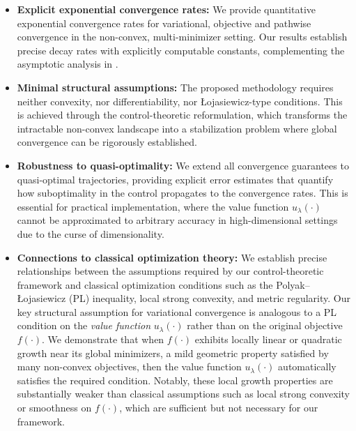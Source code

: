 \documentclass[12pt]{amsart}
\numberwithin{equation}{section}
\theoremstyle{plain}
\begin{document}
\begin{itemize}
	\item \textbf{Explicit exponential convergence rates:} We provide quantitative exponential convergence rates for variational, objective and pathwise convergence in the non-convex, multi-minimizer setting. Our results establish precise decay rates with explicitly computable constants, complementing the asymptotic analysis in \cite{huang2025control}.
	
	\item \textbf{Minimal structural assumptions:} The proposed methodology requires neither convexity, nor differentiability, nor \L{}ojasiewicz-type conditions. This is achieved through the control-theoretic reformulation, which transforms the intractable non-convex landscape into a stabilization problem where global convergence can be rigorously established.
	
\item \textbf{Robustness to quasi-optimality:} We extend all convergence  guarantees to quasi-optimal trajectories, providing explicit error estimates  that quantify how suboptimality in the control propagates to the convergence  rates. This is essential for practical implementation, where the value function $u_\lambda(\cdot)$ cannot be approximated to arbitrary accuracy in high-dimensional settings due to the curse of dimensionality.
	
\item \textbf{Connections to classical optimization theory:}
	We establish precise relationships between the assumptions required by our control-theoretic framework and classical optimization conditions such as the Polyak--\L{}ojasiewicz (PL) inequality, local strong convexity, and metric regularity. Our key structural assumption for variational convergence is analogous to a PL condition on the \emph{value function} $u_{\lambda}(\cdot)$ rather than on the original objective $f(\cdot)$. We demonstrate that when $f(\cdot)$ exhibits locally linear or quadratic growth near its global minimizers, a mild geometric property satisfied by many non-convex objectives, then the value function $u_{\lambda}(\cdot)$ automatically satisfies the required condition. Notably, these local growth properties are substantially weaker than classical assumptions such as local strong convexity or smoothness on $f(\cdot)$, which are sufficient but not necessary for our framework.
\end{itemize}
\end{document}
